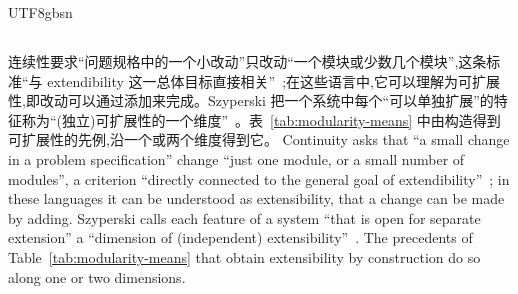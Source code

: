 \begin{CJK*}{UTF8}{gbsn}
\subsection{}
\label{sec:prior-continuity}
\ifPaperChinese
连续性要求``问题规格中的一个小改动''只改动``一个模块或少数几个模块'',这条标准``与 extendibility 这一总体目标直接相关''~\cite[第~44~页]{meyer1997-object-oriented-software-construction};在这些语言中,它可以理解为可扩展性,即改动可以通过添加来完成。Szyperski 把一个系统中每个``可以单独扩展''的特征称为``(独立)可扩展性的一个维度''~\cite[第~102~页]{szyperski2002-component-software}。表~\ref{tab:modularity-means} 中由构造得到可扩展性的先例,沿一个或两个维度得到它。
\else
Continuity asks that ``a small change in a problem specification'' change ``just one module, or a small
number of modules'', a criterion ``directly connected to the general goal of
extendibility''~\cite[p.~44]{meyer1997-object-oriented-software-construction}; in these languages it
can be understood as extensibility, that a change can be made by adding.
Szyperski calls each feature of a system ``that is open for separate extension'' a ``dimension of
(independent) extensibility''~\cite[p.~102]{szyperski2002-component-software}.
The precedents of Table~\ref{tab:modularity-means} that obtain extensibility by construction do so
along one or two dimensions.
\fi


\end{CJK*}
